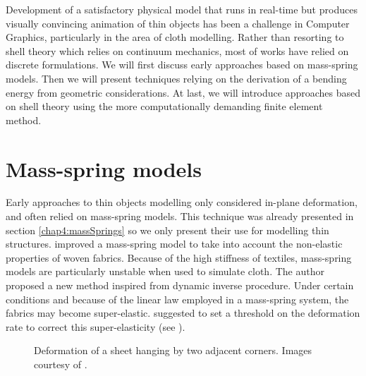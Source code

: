 Development of a satisfactory physical model that runs in real-time but produces visually convincing animation of thin objects has been a challenge in Computer Graphics, particularly in the area of cloth modelling. Rather than resorting to shell theory which relies on continuum mechanics, most of works have relied on discrete formulations. We will first discuss early approaches based on mass-spring models. Then we will present techniques relying on the derivation of a bending energy from geometric considerations. At last, we will introduce approaches based on shell theory using the more computationally demanding finite element method.

		
\section{Mass-spring models}

Early approaches to thin objects modelling only considered in-plane deformation, and often relied on mass-spring models. This technique was already presented in section \ref{chap4:massSprings} so we only present their use for modelling thin structures. \cite{Provot95} improved a mass-spring model to take into account the non-elastic properties of woven fabrics. Because of the high stiffness of textiles, mass-spring models are particularly unstable when used to simulate cloth. The author proposed a new method inspired from dynamic inverse procedure. Under certain conditions and because of the linear law employed in a mass-spring system, the fabrics may become super-elastic. \citeauthor{Provot95} suggested to set a threshold on the deformation rate to correct this super-elasticity (see ). 
%
\begin{figure}[ht]
\centering 
{}
\hfill 
{}
\hfill 
{}
\caption[Deformation of a sheet hanging by two adjacent corners]{Deformation of a sheet hanging by two adjacent corners. Images courtesy of \cite{Provot95}.}
\label{chap7:fig-sheet}
\end{figure}

